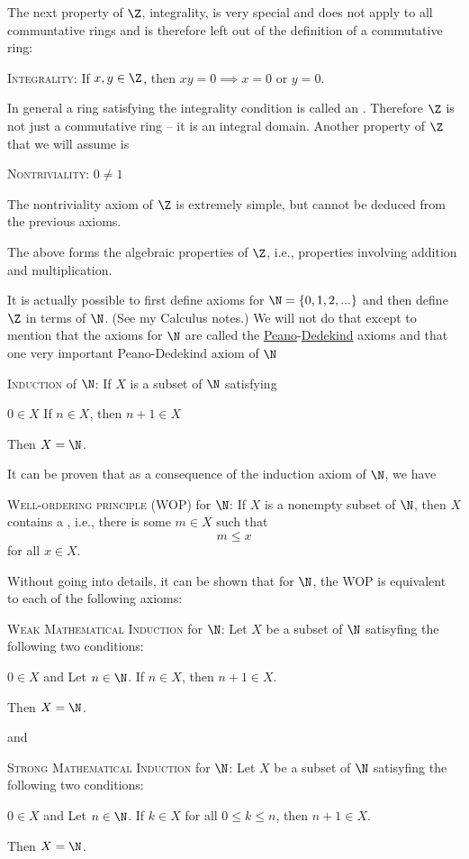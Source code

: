 The next property of $\Z$, integrality,
is very special and does not apply to all communtative rings and is therefore
left out of the definition of a commutative ring:
\begin{enumerate}[nosep]
  \li \textsc{Integrality}:
  If $x, y \in \Z$, then
  $xy = 0 \implies x = 0$ or $y = 0$.
\end{enumerate}
In general a ring satisfying the integrality condition is called an
.
Therefore $\Z$ is not just a commutative ring -- it is an integral domain.
Another property of $\Z$ that we will assume is
\begin{enumerate}[nosep]
  \li \textsc{Nontriviality}:
  $0 \neq 1$
\end{enumerate}
The nontriviality axiom of $\Z$ is extremely simple, but cannot be deduced from
the previous axioms.

The above forms the algebraic properties of $\Z$, i.e., properties involving
addition and multiplication.

It is actually possible to first define axioms for
$\N = \{0, 1, 2, ...\}$ and then define $\Z$ in terms of $\N$.
(See my Calculus notes.)
We will not do that except to mention that the
axioms for $\N$ are called the
\href{https://en.wikipedia.org/wiki/Giuseppe_Peano}{Peano}-\href{https://en.wikipedia.org/wiki/Richard_Dedekind}{Dedekind} axioms
and that one very important Peano-Dedekind axiom of $\N$
\begin{enumerate}[nosep]
  \li \textsc{Induction} of $\N$:
  If $X$ is a subset of $\N$ satisfying
  \begin{enumerate}[nosep]
  \li $0 \in X$
  \li If $n \in X$, then $n + 1 \in X$
  \end{enumerate}
  Then $X = \N$.
\end{enumerate}
It can be proven that as a consequence of the induction axiom of $\N$,
we have
\begin{enumerate}[nosep]
  \li \textsc{Well-ordering principle (WOP)} for $\N$:
  If $X$ is a nonempty subset of $\N$, then $X$ contains a
  ,
  i.e., there is some $m \in X$ such that
  \[
  m \leq x
  \]
  for all $x \in X$.
\end{enumerate}
Without going into details, it can be shown that for $\N$, the WOP
is equivalent to each of the following axioms:
\begin{enumerate}[nosep]
  \li \textsc{Weak Mathematical Induction} for $\N$:
  Let $X$ be a subset of $\N$ satisyfing the following two conditions:
  \begin{enumerate}[nosep]
    \li $0 \in X$ and
    \li Let $n \in \N$. If $n \in X$, then $n + 1 \in X$.
  \end{enumerate}
  Then $X = \N$.
\end{enumerate}
and
\begin{enumerate}[nosep]
  \li \textsc{Strong Mathematical Induction} for $\N$:
  Let $X$ be a subset of $\N$ satisyfing the following two conditions:
  \begin{enumerate}[nosep]
    \li $0 \in X$ and
    \li Let $n \in \N$. If $k \in X$ for all $0 \leq k \leq n$,
    then $n + 1 \in X$.
  \end{enumerate}
  Then $X = \N$.
\end{enumerate}
  
